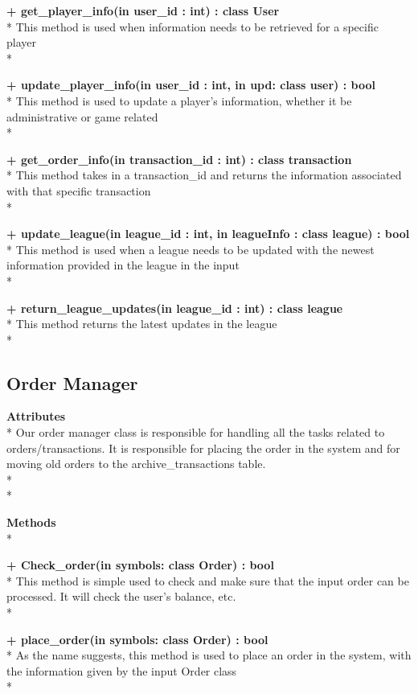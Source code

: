 {\bfseries + get_player_info(in user_id : int) : class User } \\*
	This method is used when information needs to be retrieved
    for a specific player  \\*

{\bfseries + update_player_info(in user_id : int, in upd: class user) : bool } \\*
    This method is used to update a player’s information, whether
    it be administrative or game related \\*

{\bfseries + get_order_info(in transaction_id : int) : class transaction } \\*
	This method takes in a transaction_id and returns the
    information associated with that specific transaction \\*

{\bfseries + update_league(in league_id : int, in leagueInfo : class league) : bool } \\*
	This method is used when a league needs to be updated
    with the newest information provided in the league
    in the input \\*

{\bfseries + return_league_updates(in league_id : int) : class league  }\\*
	This method returns the latest updates in the league  \\*

\subsection{Order Manager}


{\bfseries Attributes} \\*
Our order manager class is responsible for handling all the tasks related to
orders/transactions.  It is responsible for placing the order in the system
and for moving old orders to the archive_transactions table.   \\* \\*

{\bfseries Methods} \\*

{\bfseries + Check_order(in symbols: class Order) : bool} \\*
    This method is simple used to check and make sure that the
    input order can be processed.  It will check
    the user’s balance, etc. \\*

{\bfseries + place_order(in symbols: class Order) : bool } \\*
	As the name suggests, this method is used to place an order
    in the system, with the information given by the input Order
    class\\*

